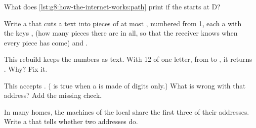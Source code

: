\begin{exercise}[$\star$]\label{exo:g8:how-the-internet-works:3}
What does \cref{lst:g8:how-the-internet-works:path} print if the 
starts at  D?
\end{exercise}

\begin{exercise}[$\star$]\label{exo:g8:how-the-internet-works:4}
Write a   that cuts a text into pieces of
at most  , numbered from 1, each a  with the keys
,  (how many pieces there are in all, so that the
receiver knows when every piece has come) and .
\end{exercise}

\begin{exercise}[$\star\star$]\label{exo:g8:how-the-internet-works:5}
This rebuild keeps the numbers as text. With 12  of one letter, from
 to , it returns . Why? Fix it.

\label{lst:g8:how-the-internet-works:rebuild-bug}
\end{exercise}

\begin{exercise}[$\star\star$]\label{exo:g8:how-the-internet-works:6}
This  accepts . ( is true when
a  is made of digits only.) What is wrong with that address? Add the
missing check.

\label{lst:g8:how-the-internet-works:valid-bug}
\end{exercise}

\begin{exercise}[$\star\star$]\label{exo:g8:how-the-internet-works:7}
In many homes, the machines of the local  share the first three 
of their addresses. Write a   that tells
whether two addresses do.
\end{exercise}

